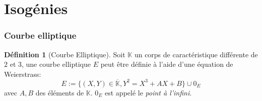 \documentclass[10pt,a4paper]{beamer}
\theoremstyle{plain}
\theoremstyle{definition}
\theoremstyle{definition}
\theoremstyle{definition}
\theoremstyle{definition}
\newtheorem{defi}[thm]{Définition}
\theoremstyle{remark}
\theoremstyle{remark}
\theoremstyle{definition}
\begin{document}
\section{Isogénies}

\begin{frame}
\frametitle{Courbe elliptique }

\begin{defi}[Courbe Elliptique]
Soit $\mathbb{K}$ un corps de caractéristique différente de $2$ et $3$, une courbe elliptique $E$ peut être définie à l'aide d'une équation de Weierstrass: 
\begin{equation*}
\label{eq:weierstrass-proj}
E:=\{ (X,Y) \in \overline{\mathbb{K}} , Y^2=X^3+AX+B \} \cup 0_E
\end{equation*}
avec $A,B$ des éléments de $\mathbb{K}$. $0_E$ est appelé le \emph{point à l'infini}. 
\end{defi}

\begin{figure}
\begin{center}

\end{center}
\end{figure}
\end{frame}
\end{document}
